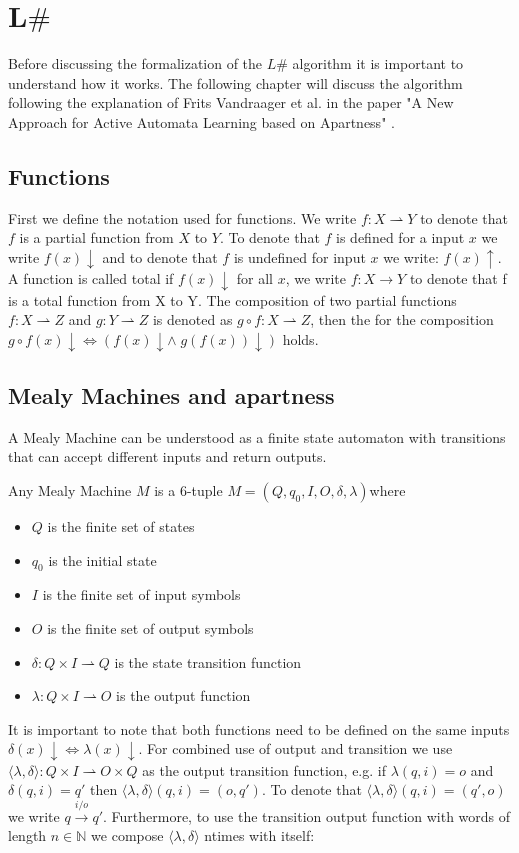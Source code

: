 \chapter{L$\#$} \label{chap:two}
Before discussing the formalization of the $L\#$ algorithm it is important to understand how it works. The following chapter will discuss the algorithm following the explanation of Frits Vandraager et al. in the paper "A New Approach for Active Automata Learning based on Apartness" \cite{vandraagerlsharp}.

\section{Functions}
First we define the notation used for functions. We write $f:X\rightharpoonup Y$ to denote that $f$ is a partial function from $X$ to $Y$. To denote that $f$ is defined for a input $x$ we write $f(x)\downarrow$ and to denote that $f$ is undefined for input $x$ we write: $f(x)\uparrow$. 
A function is called total if $f(x)\downarrow$ for all $x$, we write $f:X\rightarrow Y$ to denote that f is a total function from X to Y. The composition of two partial functions $f:X\rightharpoonup Z$ and $g:Y\rightharpoonup Z$ is denoted as $g\circ f:X\rightharpoonup Z$, then the for the composition $g\circ f(x)\downarrow\iff (f(x)\downarrow \land\; g(f(x))\downarrow)$ holds. 

\section{Mealy Machines and apartness}
A Mealy Machine can be understood as a finite state automaton with transitions that can accept different inputs and return outputs. 
\begin{definition}\label{def:Mealy}
	 Any Mealy Machine $M$ is a 6-tuple $M=(Q,q_0,I,O,\delta,\lambda)$where 
\begin{itemize}[itemsep=-8pt, topsep=-20pt]
	\item $Q$ is the finite set of states 
	\item $q_0$ is the initial state 
	\item $I$ is the finite set of input symbols
	\item $O$ is the finite set of output symbols
	\item $\delta :Q\times I\rightharpoonup Q$ is the state transition function 
	\item $\lambda :Q\times I\rightharpoonup O$ is the output function 
\end{itemize}
\end{definition}
It is important to note that both functions need to be defined on the same inputs $\delta(x)\downarrow\iff\lambda(x)\downarrow$. For combined use of output and transition we use $\langle\lambda,\delta\rangle:Q\times I\rightharpoonup O\times Q$ as the output transition function, e.g. if $\lambda(q,i)=o$ and $\delta(q,i)=q'$ then $\langle\lambda,\delta\rangle(q,i)=(o,q')$. 
 To denote that $\langle\lambda,\delta\rangle(q,i)=(q',o)$ we write $q\xrightarrow{i/o}q'$. Furthermore, to use the transition output function with words of length $n\in\mathbb{N}$ we compose $\langle\lambda,\delta\rangle$ ntimes with itself: 
 

